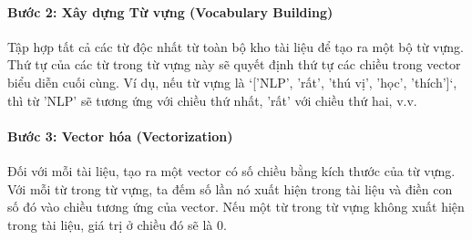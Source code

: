 \paragraph{Bước 2: Xây dựng Từ vựng (Vocabulary Building)}
Tập hợp tất cả các từ độc nhất từ toàn bộ kho tài liệu để tạo ra một bộ từ vựng. Thứ tự của các từ trong từ vựng này sẽ quyết định thứ tự các chiều trong vector biểu diễn cuối cùng.
Ví dụ, nếu từ vựng là `['NLP', 'rất', 'thú vị', 'học', 'thích']`, thì từ 'NLP' sẽ tương ứng với chiều thứ nhất, 'rất' với chiều thứ hai, v.v.

\paragraph{Bước 3: Vector hóa (Vectorization)}
Đối với mỗi tài liệu, tạo ra một vector có số chiều bằng kích thước của từ vựng. Với mỗi từ trong từ vựng, ta đếm số lần nó xuất hiện trong tài liệu và điền con số đó vào chiều tương ứng của vector. Nếu một từ trong từ vựng không xuất hiện trong tài liệu, giá trị ở chiều đó sẽ là 0.

